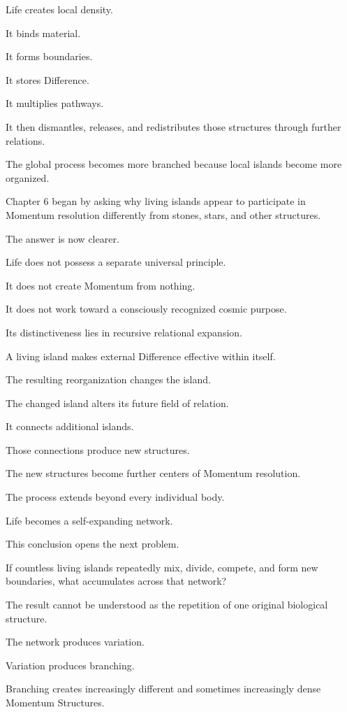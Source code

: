 Life creates local density.

It binds material.

It forms boundaries.

It stores Difference.

It multiplies pathways.

It then dismantles, releases, and redistributes those structures through further relations.

The global process becomes more branched because local islands become more organized.

Chapter 6 began by asking why living islands appear to participate in Momentum resolution differently from stones, stars, and other structures.

The answer is now clearer.

Life does not possess a separate universal principle.

It does not create Momentum from nothing.

It does not work toward a consciously recognized cosmic purpose.

Its distinctiveness lies in recursive relational expansion.

A living island makes external Difference effective within itself.

The resulting reorganization changes the island.

The changed island alters its future field of relation.

It connects additional islands.

Those connections produce new structures.

The new structures become further centers of Momentum resolution.

The process extends beyond every individual body.

Life becomes a self-expanding network.

This conclusion opens the next problem.

If countless living islands repeatedly mix, divide, compete, and form new boundaries, what accumulates across that network?

The result cannot be understood as the repetition of one original biological structure.

The network produces variation.

Variation produces branching.

Branching creates increasingly different and sometimes increasingly dense Momentum Structures.

